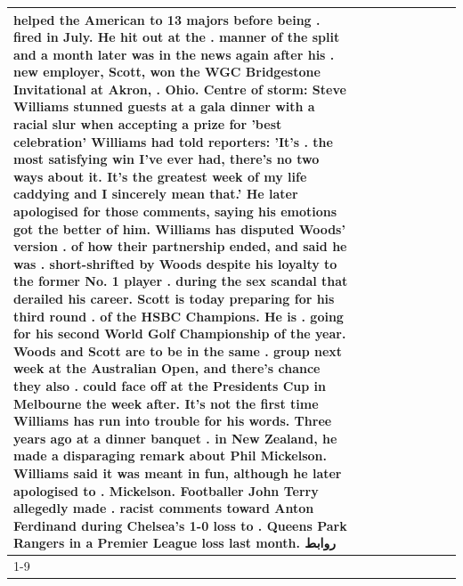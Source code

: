 \begin{table}[H]
\begin{tabular}{lllrlllll}
helped the American to 13 majors before being . fired in July. He hit out at the . manner of the split and a month later was in the news again after his . new employer, Scott, won the WGC Bridgestone Invitational at Akron, . Ohio. Centre of storm: Steve Williams stunned guests at a gala dinner with a racial slur when accepting a prize for 'best celebration' Williams had told reporters: 'It's . the most satisfying win I've ever had, there's no two ways about it. It's the greatest week of my life caddying and I sincerely mean that.' He later apologised for those comments, saying his emotions got the better of him. Williams has disputed Woods' version . of how their partnership ended, and said he was . short-shrifted by Woods despite his loyalty to the former No. 1 player . during the sex scandal that derailed his career. Scott is today preparing for his third round . of the HSBC Champions. He is . going for his second World Golf Championship of the year. Woods and Scott are to be in the same . group next week at the Australian Open, and there's chance they also . could face off at the Presidents Cup in Melbourne the week after. It's not the first time Williams has run into trouble for his words. Three years ago at a dinner banquet . in New Zealand, he made a disparaging remark about Phil Mickelson. Williams said it was meant in fun, although he later apologised to . Mickelson. Footballer John Terry allegedly made . racist comments toward Anton Ferdinand during Chelsea's 1-0 loss to . Queens Park Rangers in a Premier League loss last month. روابط \\
\cline{1-9}
\bottomrule
\end{tabular}
\end{table}
